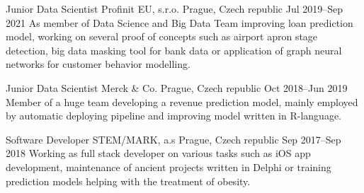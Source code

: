 

\begin{cventries}

    \cventry
    {Junior Data Scientist} %
    {Profinit EU, s.r.o.} %
    {Prague, Czech republic} %
    {Jul 2019--Sep 2021} %
    { 
        As member of Data Science and Big Data Team improving loan prediction model, working on several proof of concepts such as airport apron stage detection, big data masking tool for bank data or application of graph neural networks for customer behavior modelling. 
    }
    
    \cventry
    {Junior Data Scientist} %
    {Merck \& Co.} %
    {Prague, Czech republic} %
    {Oct 2018--Jun 2019} %
    { 
      Member of a huge team developing a revenue prediction model, mainly employed by automatic deploying pipeline and improving model written in R-language. 
    }
    
    \cventry
    {Software Developer} %
    {STEM/MARK, a.s} %
    {Prague, Czech republic} %
    {Sep 2017--Sep 2018} %
    {
      Working as full stack developer on various tasks such as iOS app development, maintenance of ancient projects written in Delphi or training prediction models helping with the treatment of obesity. 
    }

\end{cventries}
